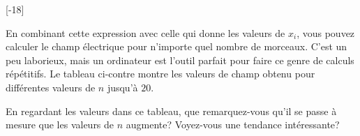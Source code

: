 [-18\baselineskip]

En combinant cette expression avec celle qui donne les valeurs de $x_i$, vous
pouvez calculer le champ électrique pour n'importe quel nombre de morceaux.
C'est un peu laborieux, mais un ordinateur est l'outil parfait pour faire ce
genre de calculs répétitifs. Le tableau ci-contre montre les valeurs de champ
obtenu pour différentes valeurs de $n$ jusqu'à $20$.

En regardant les valeurs dans ce tableau, que remarquez-vous qu'il se passe à
mesure que les valeurs de $n$ augmente? Voyez-vous une tendance intéressante?

